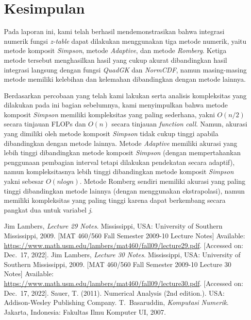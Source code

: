 \documentclass[journal,12pt,onecolumn,a4paper]{IEEEtran}
\begin{document}
\section{Kesimpulan}
Pada laporan ini, kami telah berhasil mendemonstrasikan bahwa integrasi numerik fungsi \emph{z-table} dapat dilakukan menggunakan tiga metode numerik, yaitu metode komposit \emph{Simpson}, metode \emph{Adaptive}, dan metode \emph{Romberg}. Ketiga metode tersebut menghasilkan hasil yang cukup akurat dibandingkan hasil integrasi langsung dengan fungsi \emph{QuadGK} dan \emph{NormCDF}, namun masing-masing metode memiliki kelebihan dan kelemahan dibandingkan dengan metode lainnya.

Berdasarkan percobaan yang telah kami lakukan serta analisis kompleksitas yang dilakukan pada ini bagian sebelumnya, kami menyimpulkan bahwa metode komposit \emph{Simpson} memiliki kompleksitas yang paling sederhana, yakni \(O(n/2)\) secara tinjauan FLOPs dan \(O(n)\) secara tinjauan \emph{function call}. Namun, akurasi yang dimiliki oleh metode komposit \emph{Simpson} tidak cukup tinggi apabila dibandingkan dengan metode lainnya. Metode \emph{Adaptive} memiliki akurasi yang lebih tinggi dibandingkan metode komposit \emph{Simpson} (dengan mempertahankan penggunaan pembagian interval tetapi dilakukan pendekatan secara adaptif), namun kompleksitasnya lebih tinggi dibandingkan metode komposit \emph{Simpson} yakni sebesar \(O(n log n)\). Metode Romberg sendiri memiliki akurasi yang paling tinggi dibandingkan metode lainnya (dengan menggunakan ekstrapolasi), namun memiliki kompleksitas yang paling tinggi karena dapat berkembang secara pangkat dua untuk variabel \emph{j}.


\begin{thebibliography}{1}
	Jim Lambers, \emph{Lecture 29 Notes}.
	Mississippi, USA: University of Southern Mississippi, 2009. [MAT 460/560 Fall Semester 2009-10 Lecture Notes] Available: \url{https://www.math.usm.edu/lambers/mat460/fall09/lecture29.pdf}. [Accessed on: Dec.~17, 2022].
	Jim Lambers, \emph{Lecture 30 Notes}.
	Mississippi, USA: University of Southern Mississippi, 2009. [MAT 460/560 Fall Semester 2009-10 Lecture 30 Notes] Available: \url{https://www.math.usm.edu/lambers/mat460/fall09/lecture30.pdf}. [Accessed on: Dec.~17, 2022].
	 Sauer, T. (2011). Numerical Analysis (2nd edition.). USA: Addison-Wesley Publishing Company.
	T.~Basaruddin, \emph{Komputasi Numerik}. Jakarta, Indonesia: Fakultas Ilmu Komputer UI, 2007.
\end{thebibliography}
\end{document}
